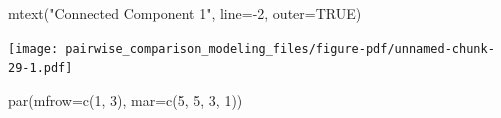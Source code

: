 \documentclass[
  letterpaper,
  DIV=11,
  numbers=noendperiod]{scrartcl}
\newenvironment{Shaded}{\begin{snugshade}}{\end{snugshade}}
\newcommand{\AttributeTok}[1]{\textcolor[rgb]{0.40,0.45,0.13}{#1}}
\newcommand{\ConstantTok}[1]{\textcolor[rgb]{0.56,0.35,0.01}{#1}}
\newcommand{\DecValTok}[1]{\textcolor[rgb]{0.68,0.00,0.00}{#1}}
\newcommand{\FunctionTok}[1]{\textcolor[rgb]{0.28,0.35,0.67}{#1}}
\newcommand{\NormalTok}[1]{\textcolor[rgb]{0.00,0.23,0.31}{#1}}
\newcommand{\SpecialCharTok}[1]{\textcolor[rgb]{0.37,0.37,0.37}{#1}}
\newcommand{\StringTok}[1]{\textcolor[rgb]{0.13,0.47,0.30}{#1}}
\begin{document}
\begin{Shaded}
\begin{Highlighting}[]
\FunctionTok{mtext}\NormalTok{(}\StringTok{"Connected Component 1"}\NormalTok{, }\AttributeTok{line=}\SpecialCharTok{{-}}\DecValTok{2}\NormalTok{, }\AttributeTok{outer=}\ConstantTok{TRUE}\NormalTok{)}
\end{Highlighting}
\end{Shaded}

\texttt{[image: pairwise\_comparison\_modeling\_files/figure-pdf/unnamed-chunk-29-1.pdf]}

\begin{Shaded}
\begin{Highlighting}[]
\FunctionTok{par}\NormalTok{(}\AttributeTok{mfrow=}\FunctionTok{c}\NormalTok{(}\DecValTok{1}\NormalTok{, }\DecValTok{3}\NormalTok{), }\AttributeTok{mar=}\FunctionTok{c}\NormalTok{(}\DecValTok{5}\NormalTok{, }\DecValTok{5}\NormalTok{, }\DecValTok{3}\NormalTok{, }\DecValTok{1}\NormalTok{))}


\end{Highlighting}
\end{Shaded}
\end{document}
